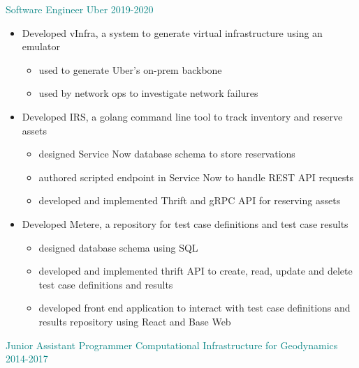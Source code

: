 \documentclass[11pt]{ltxdoc}
\begin{document}
		{\textcolor{teal}{Software Engineer} \hfill \textcolor{teal}{Uber} \hfill \textcolor{teal}{2019-2020}}
		\begin{itemize}
			\item Developed vInfra, a system to generate virtual infrastructure using an emulator
			\begin{itemize}
				\item used to generate Uber's on-prem backbone
				\item used by network ops to investigate network failures
			\end {itemize}
			
			\item Developed IRS, a golang command line tool to track inventory and reserve assets
			\begin{itemize}
				\item designed Service Now database schema to store reservations
				\item authored scripted endpoint in Service Now to handle REST API requests
				\item developed and implemented Thrift and gRPC API for reserving assets
			\end {itemize}
			
			\item Developed Metere, a repository for test case definitions and test case results
		 	\begin{itemize}
		 	  \item designed database schema using SQL
		 	  \item developed and implemented thrift API to create, read, update and delete test case definitions and results
		 	  \item developed front end application to interact with test case definitions and results repository using React and Base Web
		 	\end{itemize}
	 	\end{itemize}

	{\textcolor{teal}{Junior Assistant Programmer} \hfill \textcolor{teal}{Computational Infrastructure for Geodynamics} \hfill \textcolor{teal}{2014-2017}}
\end{document}
